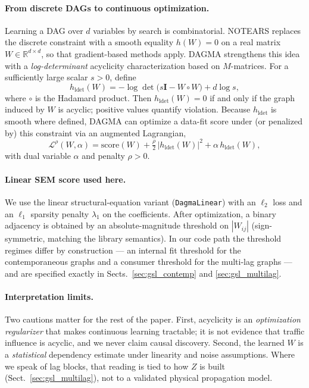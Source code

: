 \paragraph{From discrete DAGs to continuous optimization.}
Learning a DAG over $d$ variables by search is combinatorial. NOTEARS
replaces the discrete constraint with a smooth equality $h(W)=0$ on a real
matrix $W\in\mathbb{R}^{d\times d}$, so that gradient-based methods apply.
DAGMA strengthens this idea with a \emph{log-determinant} acyclicity
characterization based on $M$-matrices. For a sufficiently large scalar
$s>0$, define
\begin{equation}\label{eq:dagma-h}
h_{\mathrm{ldet}}(W)
= -\log\det\!\big(s\mathbf{I}-W\circ W\big) + d\log s,
\end{equation}
where $\circ$ is the Hadamard product. Then $h_{\mathrm{ldet}}(W)=0$ if and
only if the graph induced by $W$ is acyclic; positive values quantify
violation. Because $h_{\mathrm{ldet}}$ is smooth where defined, DAGMA can
optimize a data-fit score under (or penalized by) this constraint via an
augmented Lagrangian,
\begin{equation}\label{eq:dagma-al}
\mathcal{L}^{\rho}(W,\alpha)
= \mathrm{score}(W)
+ \tfrac{\rho}{2}\,\big|h_{\mathrm{ldet}}(W)\big|^{2}
+ \alpha\, h_{\mathrm{ldet}}(W),
\end{equation}
with dual variable $\alpha$ and penalty $\rho>0$.

\paragraph{Linear SEM score used here.}
We use the linear structural-equation variant (\texttt{DagmaLinear}) with
an $\ell_2$ loss and an $\ell_1$ sparsity penalty $\lambda_1$ on the
coefficients. After optimization, a binary adjacency is obtained by an
absolute-magnitude threshold on $|W_{ij}|$ (sign-symmetric, matching the
library semantics). In our code path the threshold regimes differ by
construction --- an internal fit threshold for the contemporaneous graphs
and a consumer threshold for the multi-lag graphs --- and are specified
exactly in Sects.~\ref{sec:gsl_contemp} and \ref{sec:gsl_multilag}.

\paragraph{Interpretation limits.}
Two cautions matter for the rest of the paper. First, acyclicity is an
\emph{optimization regularizer} that makes continuous learning tractable;
it is not evidence that traffic influence is acyclic, and we never claim
causal discovery. Second, the learned $W$ is a \emph{statistical}
dependency estimate under linearity and noise assumptions. Where we speak
of lag blocks, that reading is tied to how $Z$ is built
(Sect.~\ref{sec:gsl_multilag}), not to a validated physical propagation
model.

